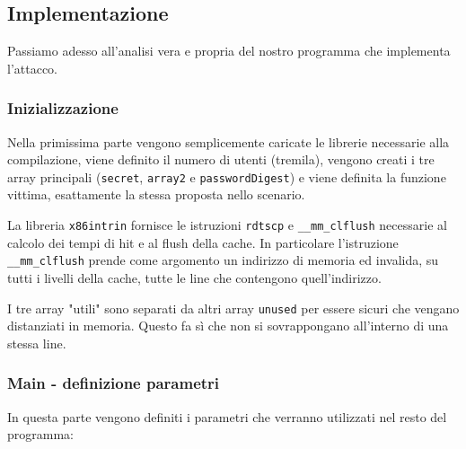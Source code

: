 			\subsection{Implementazione}
				Passiamo adesso all'analisi vera e propria del nostro programma che implementa l'attacco.
				
				\subsubsection{Inizializzazione}
				
				Nella primissima parte vengono semplicemente caricate le librerie necessarie alla compilazione, viene definito il numero di utenti (tremila), vengono creati i tre array principali (\texttt{secret}, \texttt{array2} e \texttt{passwordDigest}) e viene definita la funzione vittima, esattamente la stessa proposta nello scenario.
				
 				La libreria \texttt{x86intrin} fornisce le istruzioni \texttt{rdtscp} e \texttt{\_\_mm\_clflush} necessarie al calcolo dei tempi di hit e al flush della cache. In particolare l'istruzione \texttt{\_\_mm\_clflush} prende come argomento un indirizzo di memoria ed invalida, su tutti i livelli della cache, tutte le line che contengono quell'indirizzo.
				
				I tre array "utili" sono separati da altri array \texttt{unused} per essere sicuri che vengano distanziati in memoria. Questo fa sì che non si sovrappongano all'interno di una stessa line.
				
				\subsubsection{Main - definizione parametri}
				
				In questa parte vengono definiti i parametri che verranno utilizzati nel resto del programma:
				

